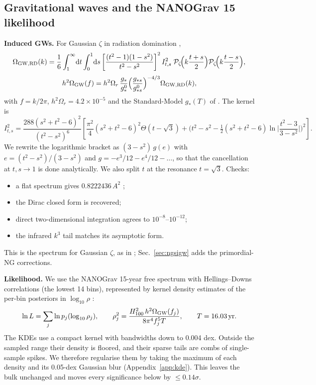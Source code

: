 \documentclass[11pt,a4paper]{article}
\newcommand{\dd}{\mathrm{d}}
\newcommand{\Pz}{\mathcal{P}_\zeta}
\begin{document}
\subsection{Gravitational waves and the NANOGrav 15 likelihood}

\textbf{Induced GWs.} For Gaussian $\zeta$ in radiation domination
\cite{Kohri,Espinosa,FIVT23},
\begin{equation}
\Omega_{\rm GW,RD}(k)=\frac16\int_1^\infty\!\dd t\int_0^1\!\dd s\left[\frac{(t^2-1)(1-s^2)}{t^2-s^2}\right]^2
I^2_{t,s}\;\Pz\!\Big(k\frac{t+s}{2}\Big)\Pz\!\Big(k\frac{t-s}{2}\Big),
\end{equation}
\begin{equation}
h^2\Omega_{\rm GW}(f)=h^2\Omega_r\,\frac{g_*}{g_*^0}\Big(\frac{g_{*s}}{g_{*s}^0}\Big)^{-4/3}\Omega_{\rm GW,RD}(k),
\end{equation}
with $f=k/2\pi$, $h^2\Omega_r=4.2\times10^{-5}$ and the Standard-Model $g_*(T)$ of \cite{Saikawa}.
The kernel is \cite{Kohri,FIVT23}
\begin{equation}
I^2_{t,s}=\frac{288(s^2+t^2-6)^2}{(t^2-s^2)^6}\left[\frac{\pi^2}{4}(s^2+t^2-6)^2\Theta(t-\sqrt3)
+\Big(t^2-s^2-\tfrac12(s^2+t^2-6)\ln\Big|\frac{t^2-3}{3-s^2}\Big|\Big)^2\right].
\end{equation}
We rewrite the logarithmic bracket as $(3-s^2)\,g(e)$ with $e=(t^2-s^2)/(3-s^2)$ and
$g=-e^3/12-e^4/12-\dots$, so that the cancellation at $t,s\to1$ is done analytically. We also
split $t$ at the resonance $t=\sqrt3$.
Checks:
\begin{itemize}
\item a flat spectrum gives $0.8222436\,A^2$ \cite{Kohri};
\item the Dirac closed form is recovered;
\item direct two-dimensional integration agrees to $10^{-8}$--$10^{-12}$;
\item the infrared $k^3$ tail matches its asymptotic form.
\end{itemize}
This is the spectrum for Gaussian $\zeta$, as in \cite{FIVT23}; Sec.~\ref{sec:ngsigw} adds the
primordial-NG corrections.

\textbf{Likelihood.} We use the NANOGrav 15-year free spectrum with Hellings--Downs correlations
(the lowest 14 bins), represented by kernel density estimates of the per-bin posteriors in
$\log_{10}\rho$ \cite{Lamb,PTArcade}:
\begin{equation}
\ln L=\sum_j\ln p_j(\log_{10}\rho_j),\qquad
\rho_j^2=\frac{H_{100}^2\,h^2\Omega_{\rm GW}(f_j)}{8\pi^4f_j^5T},\qquad T=16.03\,{\rm yr}.
\end{equation}
The KDEs use a compact kernel with bandwidths down to 0.004 dex. Outside the sampled range their
density is floored, and their sparse tails are combs of single-sample spikes. We therefore
regularise them by taking the maximum of each density and its 0.05-dex Gaussian blur
(Appendix~\ref{app:kde}). This leaves the bulk unchanged and moves every significance below by
$\le0.14\sigma$.
\end{document}
